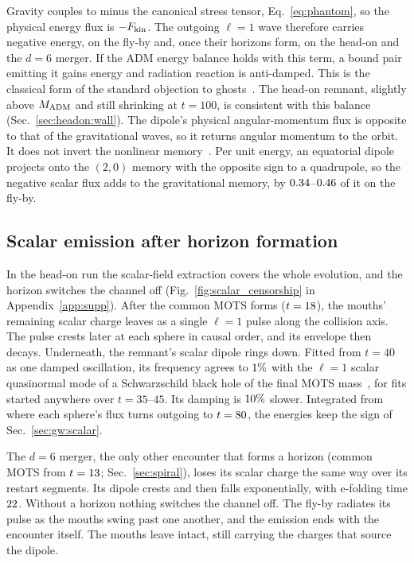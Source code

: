 \documentclass[twocolumn,floatfix,aps,prd,superscriptaddress,nofootinbib,showkeys]{revtex4-2}
\begin{document}
Gravity couples to minus the canonical stress tensor, Eq.~\eqref{eq:phantom}, so the physical energy flux is $-F_{\rm kin}$. The outgoing $\ell=1$ wave therefore carries negative energy, on the fly-by and, once their horizons form, on the head-on and the $d=6$ merger. If the ADM energy balance holds with this term, a bound pair emitting it gains energy and radiation reaction is anti-damped. This is the classical form of the standard objection to ghosts~\cite{carroll2003,cline2004}. The head-on remnant, slightly above $M_{\rm ADM}$ and still shrinking at $t=100$, is consistent with this balance (Sec.~\ref{sec:headon:wall}). The dipole's physical angular-momentum flux is opposite to that of the gravitational waves, so it returns angular momentum to the orbit. It does not invert the nonlinear memory~\cite{christodoulou1991,thorne1992,favata2009}. Per unit energy, an equatorial dipole projects onto the $(2,0)$ memory with the opposite sign to a quadrupole, so the negative scalar flux adds to the gravitational memory, by $0.34$--$0.46$ of it on the fly-by.

\subsection{Scalar emission after horizon formation}
\label{sec:gw:censorship}

In the head-on run the scalar-field extraction covers the whole evolution, and the horizon switches the channel off (Fig.~\ref{fig:scalar_censorship} in Appendix~\ref{app:supp}). After the common MOTS forms ($t=18$), the mouths' remaining scalar charge leaves as a single $\ell=1$ pulse along the collision axis. The pulse crests later at each sphere in causal order, and its envelope then decays. Underneath, the remnant's scalar dipole rings down. Fitted from $t=40$ as one damped oscillation, its frequency agrees to $1\%$ with the $\ell=1$ scalar quasinormal mode of a Schwarzschild black hole of the final MOTS mass~\cite{berti2009}, for fits started anywhere over $t=35$--$45$. Its damping is $10\%$ slower. Integrated from where each sphere's flux turns outgoing to $t=80$, the energies keep the sign of Sec.~\ref{sec:gw:scalar}.

The $d=6$ merger, the only other encounter that forms a horizon (common MOTS from $t=13$; Sec.~\ref{sec:spiral}), loses its scalar charge the same way over its restart segments. Its dipole crests and then falls exponentially, with e-folding time $22$. Without a horizon nothing switches the channel off. The fly-by radiates its pulse as the mouths swing past one another, and the emission ends with the encounter itself. The mouths leave intact, still carrying the charges that source the dipole.
\end{document}
